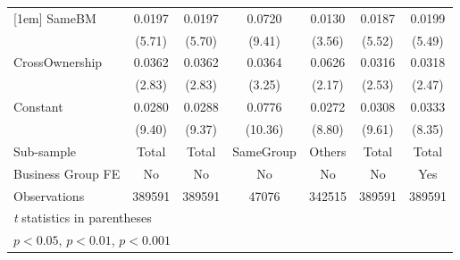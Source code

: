 {\begin{tabular}{l*{6}{c}}
[1em]
SameBM              &      0.0197\sym{***}&      0.0197\sym{***}&      0.0720\sym{***}&      0.0130\sym{***}&      0.0187\sym{***}&      0.0199\sym{***}\\
                    &      (5.71)         &      (5.70)         &      (9.41)         &      (3.56)         &      (5.52)         &      (5.49)         \\
[1em]
CrossOwnership      &      0.0362\sym{**} &      0.0362\sym{**} &      0.0364\sym{**} &      0.0626\sym{*}  &      0.0316\sym{*}  &      0.0318\sym{*}  \\
                    &      (2.83)         &      (2.83)         &      (3.25)         &      (2.17)         &      (2.53)         &      (2.47)         \\
[1em]
Constant            &      0.0280\sym{***}&      0.0288\sym{***}&      0.0776\sym{***}&      0.0272\sym{***}&      0.0308\sym{***}&      0.0333\sym{***}\\
                    &      (9.40)         &      (9.37)         &     (10.36)         &      (8.80)         &      (9.61)         &      (8.35)         \\
\hline
Sub-sample          &       Total         &       Total         &   SameGroup         &      Others         &       Total         &       Total         \\
Business Group FE   &          No         &          No         &          No         &          No         &          No         &         Yes         \\
Observations        &      389591         &      389591         &       47076         &      342515         &      389591         &      389591         \\
\hline\hline
\multicolumn{7}{l}{\footnotesize \textit{t} statistics in parentheses}\\
\multicolumn{7}{l}{\footnotesize \sym{*} \(p<0.05\), \sym{**} \(p<0.01\), \sym{***} \(p<0.001\)}\\
\end{tabular}
}
